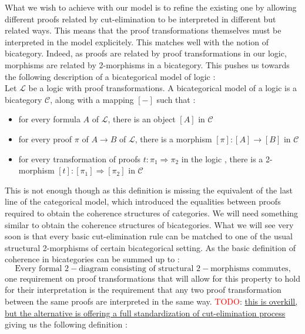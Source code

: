 \documentclass[a4paper, 12pt, twoside,openright]{report}
\newcommand{\todo}[1]{\textcolor{red}{TODO}: \underline{#1}}
\begin{document}
What we wish to achieve with our model is to refine the existing one by allowing different proofs related by cut-elimination to be interpreted in different but related ways. This means that the proof transformations themselves must be interpreted in the model explicitely. This matches well with the notion of bicategory. Indeed, as proofs are related by proof transformations in our logic, morphisms are related by 2-morphisms in a bicategory. This pushes us towards the following description of a bicategorical model of logic : \\

Let $\mathcal{L}$ be a logic with proof transformations. A bicategorical model of a logic is a bicategory $\mathcal{C}$, along with a mapping $[ - ]$ such that : 
\begin{itemize}
\item for every formula $A$ of $\mathcal{L}$, there is an object $[A]$ in $\mathcal{C}$
\item for every proof $\pi$ of $A\rightarrow B$ of $\mathcal{L}$, there is a morphism $[\pi]: [A] \rightarrow [B]$ in $\mathcal{C}$
\item for every transformation of proofs $t:\pi_1 \Rightarrow \pi_2$ in the logic , there is a 2-morphism $[t]: [\pi_1]\Rightarrow [\pi_2]$ in  $\mathcal{C}$
\end{itemize}

This is not enough though as this definition is missing the equivalent of the last line of the categorical model, which introduced the equalities between proofs required to obtain the coherence structures of categories. We will need something similar to obtain the coherence structures of bicategories. What we will see very soon  is that every basic cut-elimination rule can be matched to one of the usual structural 2-morphisms of certain bicategorical setting. As the basic definition of coherence in bicategories can be summed up to :\\
$$\text{Every formal $2-$diagram consisting of structural $2-$morphisms commutes,}$$
one requirement on proof transformations that will allow for this property to hold for their interpretation is the requirement that any two proof transformation between the same proofs are interpreted in the same way. \todo{this is overkill, but the alternative is offering a full standardization of cut-elimination process} giving us the following definition : 
 
\end{document}

